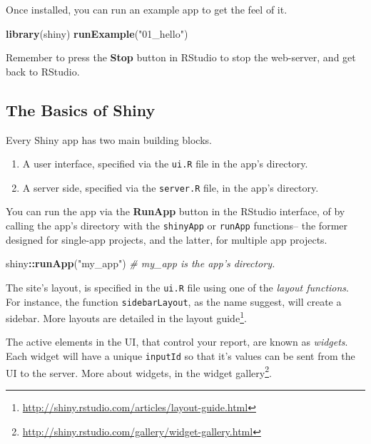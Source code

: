 \documentclass[]{book}
\newenvironment{Shaded}{\begin{snugshade}}{\end{snugshade}}
\newcommand{\CommentTok}[1]{\textcolor[rgb]{0.56,0.35,0.01}{\textit{#1}}}
\newcommand{\KeywordTok}[1]{\textcolor[rgb]{0.13,0.29,0.53}{\textbf{#1}}}
\newcommand{\NormalTok}[1]{#1}
\newcommand{\OperatorTok}[1]{\textcolor[rgb]{0.81,0.36,0.00}{\textbf{#1}}}
\newcommand{\StringTok}[1]{\textcolor[rgb]{0.31,0.60,0.02}{#1}}
\providecommand{\tightlist}{%
  \setlength{\itemsep}{0pt}\setlength{\parskip}{0pt}}
\renewcommand{\href}[2]{#2\footnote{\url{#1}}}
\theoremstyle{definition}
\theoremstyle{definition}
\theoremstyle{definition}
\theoremstyle{remark}
\begin{document}
Once installed, you can run an example app to get the feel of it.

\begin{Shaded}
\begin{Highlighting}[]
\KeywordTok{library}\NormalTok{(shiny)}
\KeywordTok{runExample}\NormalTok{(}\StringTok{"01_hello"}\NormalTok{)}
\end{Highlighting}
\end{Shaded}

Remember to press the \textbf{Stop} button in RStudio to stop the web-server, and get back to RStudio.

\hypertarget{the-basics-of-shiny}{%
\subsection{The Basics of Shiny}\label{the-basics-of-shiny}}

Every Shiny app has two main building blocks.

\begin{enumerate}
\def\labelenumi{\arabic{enumi}.}
\tightlist
\item
  A user interface, specified via the \texttt{ui.R} file in the app's directory.
\item
  A server side, specified via the \texttt{server.R} file, in the app's directory.
\end{enumerate}

You can run the app via the \textbf{RunApp} button in the RStudio interface, of by calling the app's directory with the \texttt{shinyApp} or \texttt{runApp} functions-- the former designed for single-app projects, and the latter, for multiple app projects.

\begin{Shaded}
\begin{Highlighting}[]
\NormalTok{shiny}\OperatorTok{::}\KeywordTok{runApp}\NormalTok{(}\StringTok{"my_app"}\NormalTok{) }\CommentTok{# my_app is the app's directory.}
\end{Highlighting}
\end{Shaded}

The site's layout, is specified in the \texttt{ui.R} file using one of the \emph{layout functions}.
For instance, the function \texttt{sidebarLayout}, as the name suggest, will create a sidebar.
More layouts are detailed in the \href{http://shiny.rstudio.com/articles/layout-guide.html}{layout guide}.

The active elements in the UI, that control your report, are known as \emph{widgets}.
Each widget will have a unique \texttt{inputId} so that it's values can be sent from the UI to the server.
More about widgets, in the \href{http://shiny.rstudio.com/gallery/widget-gallery.html}{widget gallery}.
\end{document}
